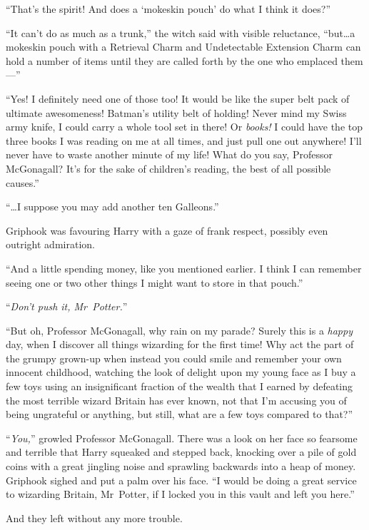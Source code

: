 “That’s the spirit! And does a ‘mokeskin pouch’ do what I think it does?”

“It can’t do as much as a trunk,” the witch said with visible reluctance, “but…a mokeskin pouch with a Retrieval Charm and Undetectable Extension Charm can hold a number of items until they are called forth by the one who emplaced them—”

“Yes! I definitely need one of those too! It would be like the super belt pack of ultimate awesomeness! Batman’s utility belt of holding! Never mind my Swiss army knife, I could carry a whole tool set in there! Or \emph{books!} I could have the top three books I was reading on me at all times, and just pull one out anywhere! I’ll never have to waste another minute of my life! What do you say, Professor McGonagall? It’s for the sake of children’s reading, the best of all possible causes.”

“…I suppose you may add another ten Galleons.”

Griphook was favouring Harry with a gaze of frank respect, possibly even outright admiration.

“And a little spending money, like you mentioned earlier. I think I can remember seeing one or two other things I might want to store in that pouch.”

“\emph{Don’t push it, Mr~Potter.}”

“But oh, Professor McGonagall, why rain on my parade? Surely this is a \emph{happy} day, when I discover all things wizarding for the first time! Why act the part of the grumpy grown-up when instead you could smile and remember your own innocent childhood, watching the look of delight upon my young face as I buy a few toys using an insignificant fraction of the wealth that I earned by defeating the most terrible wizard Britain has ever known, not that I’m accusing you of being ungrateful or anything, but still, what are a few toys compared to that?”

“\emph{You,}” growled Professor McGonagall. There was a look on her face so fearsome and terrible that Harry squeaked and stepped back, knocking over a pile of gold coins with a great jingling noise and sprawling backwards into a heap of money. Griphook sighed and put a palm over his face. “I would be doing a great service to wizarding Britain, Mr~Potter, if I locked you in this vault and left you here.”

And they left without any more trouble.

